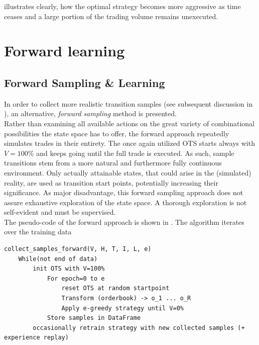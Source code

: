  illustrates clearly, how the optimal strategy becomes more aggressive as time ceases and a large portion of the trading volume remains unexecuted.




\section{Forward learning}
\label{chap:forwardlearning}

\subsection{Forward Sampling \& Learning}
In order to collect more realistic transition samples (see subsequent discussion in ), an alternative, \emph{forward sampling} method is presented.\\

Rather than examining all available actions on the great variety of combinational possibilities the state space has to offer, the forward approach repeatedly simulates trades in their entirety. The once again utilized \ac{OTS} starts always with $V=100\%$ and keeps going until the full trade is executed. As such, sample transitions stem from a more natural and furthermore fully continuous environment. Only actually attainable states, that could arise in the (simulated) reality, are used as transition start points, potentially increasing their significance. As major disadvantage, this forward sampling approach does not assure exhaustive exploration of the state space. A thorough exploration is not self-evident and must be supervised.\\

The pseudo-code of the forward approach is shown in . The algorithm iterates over the training data 

\begin{lstlisting}[frame=single, breaklines=true, basicstyle=\scriptsize, caption=Forward sampling approach., label=lst:forward:pseudocode]
collect_samples_forward(V, H, T, I, L, e)
    While(not end of data)
        init OTS with V=100%
            For epoch=0 to e
                reset OTS at random startpoint
	            Transform (orderbook) -> o_1 ... o_R
	            Apply e-greedy strategy until V=0%
		    Store samples in DataFrame
        occasionally retrain strategy with new collected samples (+ experience replay)
\end{lstlisting}






